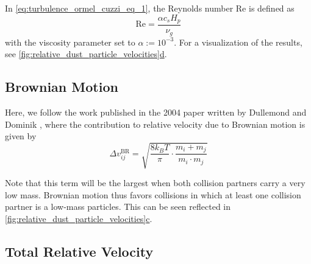         In \cref{eq:turbulence_ormel_cuzzi_eq_1}, the Reynolds number $\text{Re}$ is defined as
        \begin{equation}
            \text{Re} = \frac{\alpha c_s H_p}{\nu_g}
        \end{equation}
        with the viscosity parameter set to $\alpha := 10^{-3}$. 
        For a visualization of the results, see \hyperref[fig:relative_dust_particle_velocities]
        {\cref*{fig:relative_dust_particle_velocities}d}.

    \clearpage\subsection{Brownian Motion}

        Here, we follow the work published in the 2004 paper written by Dullemond and Dominik 
        \cite{dullemond_dominik_2004}, where the contribution to relative velocity due to Brownian 
        motion is given by
        \begin{equation}
            \Delta v_{ij}^\text{BR}
            =\sqrt{\frac{8k_BT}{\pi}\cdot\frac{m_i+m_j}{m_i\cdot m_j}}
        \end{equation}

        Note that this term will be the largest when both collision partners carry a very low mass.
        Brownian motion thus favors collisions in which at least one collision partner is a 
        low-mass particles. This can be seen reflected in 
        \hyperref[fig:relative_dust_particle_velocities]{
        \cref*{fig:relative_dust_particle_velocities}c}.

    \subsection{Total Relative Velocity}

